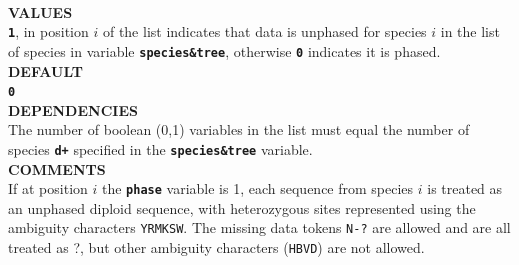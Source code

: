 \documentclass[a4paper]{book}
\numberwithin{equation}{section} \renewcommand{\baselinestretch}{0.55}
\begin{document}
\vspace{5pt}\\
\textbf{VALUES} \vspace{5pt}\\
\textbf{\texttt{1}}, in position $i$ of the list indicates that data is unphased for species $i$ in the list of species in variable \textbf{\texttt{species\&tree}}, otherwise \textbf{\texttt{0}} indicates it is phased. \vspace{5pt}\\
\textbf{DEFAULT} \vspace{5pt}\\
\textbf{\texttt{0}} \vspace{5pt}\\
\textbf{DEPENDENCIES} \vspace{5pt}\\
The number of boolean (0,1) variables in the list must equal the number of species \textbf{\texttt{d+}} specified in the \textbf{\texttt{species\&tree}} variable. \vspace{5pt}\\
\textbf{COMMENTS} \vspace{5pt}\\
If at position $i$ the \textbf{\texttt{phase}} variable is 1, each
sequence from species $i$ is treated as an unphased diploid sequence,
with heterozygous sites represented using the ambiguity characters
\texttt{YRMKSW}.  The missing data tokens \texttt{N-?} are allowed and
are all treated as ?, but other ambiguity characters (\texttt{HBVD})
are not allowed.
\end{document}
